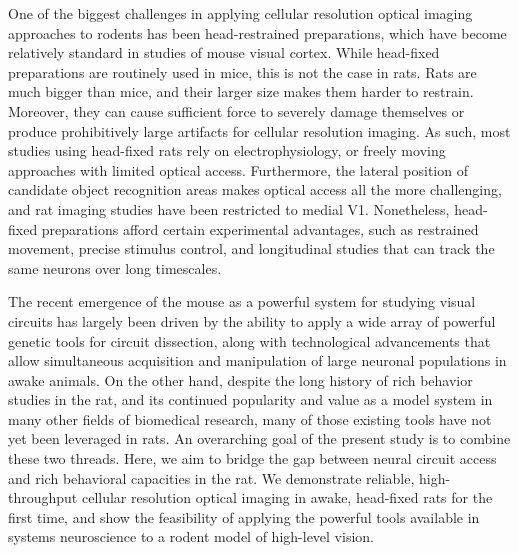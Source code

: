 One of the biggest challenges in applying cellular resolution optical imaging approaches to rodents has been head-restrained preparations, which have become relatively standard in studies of mouse visual cortex. While head-fixed preparations are routinely used in mice, this is not the case in rats. Rats are much bigger than mice, and their larger size makes them harder to restrain. Moreover, they can cause sufficient force to severely damage themselves or produce prohibitively large artifacts for cellular resolution imaging. As such, most studies using head-fixed rats rely on electrophysiology, or freely moving approaches with limited optical access\cite{Scott2013}. Furthermore, the lateral position of candidate object recognition areas makes optical access all the more challenging, and rat imaging studies have been restricted to medial V1\cite{Greenberg2008, Ohki2005}. Nonetheless, head-fixed preparations afford certain experimental advantages, such as restrained movement, precise stimulus control, and longitudinal studies that can track the same neurons over long timescales. 



The recent emergence of the mouse as a powerful system for studying visual circuits has largely been driven by the ability to apply a wide array of powerful genetic tools for circuit dissection, along with technological advancements that allow simultaneous acquisition and manipulation of large neuronal populations in awake animals. On the other hand, despite the long history of rich behavior studies in the rat, and its continued popularity and value as a model system in many other fields of biomedical research, many of those existing tools have not yet been leveraged in rats. An overarching goal of the present study is to combine these two threads. Here, we aim to bridge the gap between neural circuit access and rich behavioral capacities in the rat. We demonstrate reliable, high-throughput cellular resolution optical imaging in awake, head-fixed rats for the first time, and show the feasibility of applying the powerful tools available in systems neuroscience to a rodent model of high-level vision. 

